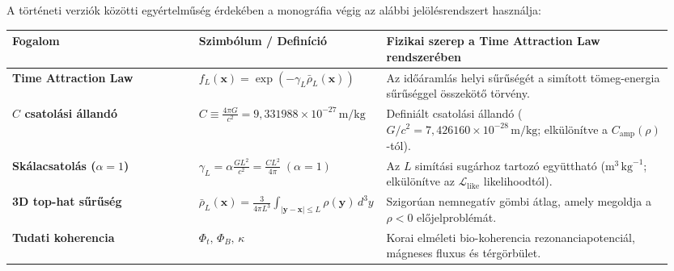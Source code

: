 \documentclass[10pt,a4paper]{article}
\begin{document}
\vspace{3mm}
\par
A t\"ort\'eneti verzi\'ok k\"oz\"otti egy\'ertelm\H{u}s\'eg \'erdek\'eben a monogr\'afia v\'egig az al\'abbi jel\"ol\'esrendszert haszn\'alja:
\begin{center}\vspace{-2pt}
{\footnotesize
\begin{tabular}{@{}>{\bfseries}p{0.28\linewidth}p{0.24\linewidth}p{0.43\linewidth}@{}}
\toprule
Fogalom & Szimb\'olum / Defin\'ici\'o & Fizikai szerep a Time Attraction Law rendszer\'eben \\
\midrule
Time Attraction Law & $f_L(\mathbf{x}) = \exp(-\gamma_L \bar{\rho}_L(\mathbf{x}))$ & Az id\H{o}\'araml\'as helyi s\H{u}r\H{u}s\'eg\'et a sim\'itott t\"omeg-energia s\H{u}r\H{u}s\'eggel \"osszek\"ot\H{o} t\"orv\'eny. \\
$C$ csatol\'asi \'alland\'o & $C \equiv \frac{4\pi G}{c^2} = 9{,}331988\times 10^{-27}\,\text{m/kg}$ & Defini\'alt csatol\'asi \'alland\'o ($G/c^2 = 7{,}426160\times 10^{-28}\,\text{m/kg}$; elk\"ul\"on\'itve a $C_{\text{amp}}(\rho)$-t\'ol). \\
Sk\'alacsatol\'as ($\alpha=1$) & $\gamma_L = \alpha\frac{G L^2}{c^2} = \frac{C L^2}{4\pi}\;(\alpha=1)$ & Az $L$ sim\'it\'asi sug\'arhoz tartoz\'o egy\"utthat\'o ($\text{m}^3\,\text{kg}^{-1}$; elk\"ul\"on\'itve az $\mathcal{L}_{\text{like}}$ likelihoodt\'ol). \\
3D top-hat s\H{u}r\H{u}s\'eg & $\bar{\rho}_L(\mathbf{x}) = \frac{3}{4\pi L^3}\int_{|\mathbf{y}-\mathbf{x}|\le L}\rho(\mathbf{y})\,d^3y$ & Szigor\'uan nemnegat\'iv g\"ombi \'atlag, amely megoldja a $\rho<0$ el\H{o}jelprobl\'em\'at. \\
Tudati koherencia & $\Phi_t,\,\Phi_B,\,\kappa$ & Korai elm\'eleti bio-koherencia rezonanciapotenci\'al, m\'agneses fluxus \'es t\'erg\"orb\"ulet. \\
\bottomrule
\end{tabular}}
\end{center}
\end{document}

